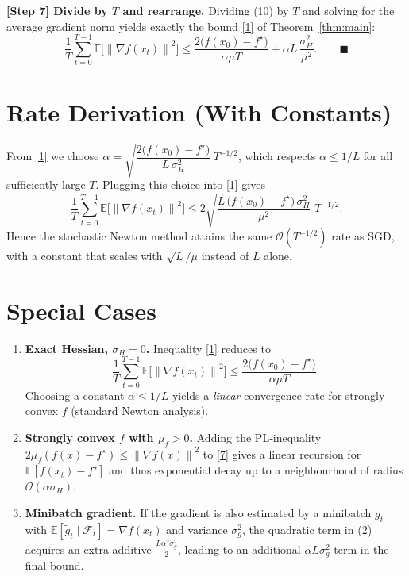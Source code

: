 \documentclass{article}
\newcommand{\E}{\mathbb{E}}
\newcommand{\norm}[1]{\left\lVert #1 \right\rVert}
\begin{document}
\noindent\textbf{[Step 7] Divide by $T$ and rearrange.}  
Dividing (10) by $T$ and solving for the average gradient norm yields exactly the bound \eqref{1} of Theorem~\ref{thm:main}:
\[
\frac{1}{T}\sum_{t=0}^{T-1}\E\!\bigl[\norm{\nabla f(x_{t})}^{2}\bigr]
\le
\frac{2\bigl(f(x_{0})-f^{\star}\bigr)}{\alpha\mu T}
+\alpha L\,\frac{\sigma_{H}^{2}}{\mu^{2}}.
\qquad\blacksquare
\]

\section*{Rate Derivation (With Constants)}
From \eqref{1} we choose $\alpha = \sqrt{\dfrac{2\bigl(f(x_{0})-f^{\star}\bigr)}{L\,\sigma_{H}^{2}}}\,T^{-1/2}$, which respects $\alpha\le 1/L$ for all sufficiently large $T$. Plugging this choice into \eqref{1} gives
\[
\frac{1}{T}\sum_{t=0}^{T-1}\E\!\bigl[\norm{\nabla f(x_{t})}^{2}\bigr]
\le
2\sqrt{\frac{L\,\bigl(f(x_{0})-f^{\star}\bigr)\,\sigma_{H}^{2}}{\mu^{2}}}\;T^{-1/2}.
\]
Hence the stochastic Newton method attains the same $\mathcal{O}(T^{-1/2})$ rate as SGD, with a constant that scales with $\sqrt{L}/\mu$ instead of $L$ alone.

\section*{Special Cases}\label{sec:special}
\begin{enumerate}
\item \textbf{Exact Hessian, $\sigma_{H}=0$.}  Inequality \eqref{1} reduces to
\[
\frac{1}{T}\sum_{t=0}^{T-1}\E\!\bigl[\norm{\nabla f(x_{t})}^{2}\bigr]
\le \frac{2\bigl(f(x_{0})-f^{\star}\bigr)}{\alpha\mu T}.
\]
Choosing a constant $\alpha\le 1/L$ yields a \emph{linear} convergence rate for strongly convex $f$ (standard Newton analysis).
\item \textbf{Strongly convex $f$ with $\mu_{f}>0$.}  Adding the PL‑inequality $2\mu_{f}(f(x)-f^{\star})\le \norm{\nabla f(x)}^{2}$ to \eqref{7} gives a linear recursion for $\E[f(x_{t})-f^{\star}]$ and thus exponential decay up to a neighbourhood of radius $\mathcal{O}(\alpha\sigma_{H})$.
\item \textbf{Minibatch gradient.} If the gradient is also estimated by a minibatch $\tilde g_{t}$ with $\E[\tilde g_{t}\mid\mathcal{F}_{t}]=\nabla f(x_{t})$ and variance $\sigma_{g}^{2}$, the quadratic term in (2) acquires an extra additive $\frac{L\alpha^{2}\sigma_{g}^{2}}{2}$, leading to an additional $\alpha L\sigma_{g}^{2}$ term in the final bound.
\end{enumerate}
\end{document}

